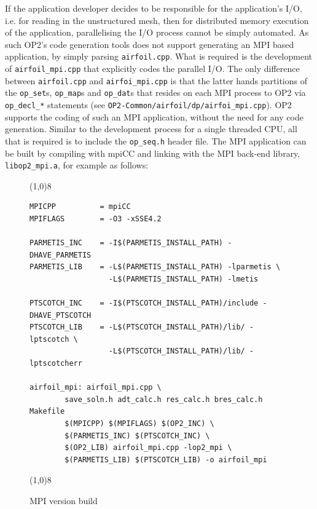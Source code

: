 \documentclass[11pt]{article}
\begin{document}
If the application developer decides to be responsible for the application's I/O, i.e. for reading in the unstructured
mesh, then for distributed memory execution of the application, parallelising the I/O process cannot be simply
automated. As such OP2's code generation tools does not support generating an MPI based application, by simply parsing
\texttt{airfoil.cpp}. What is required is the development of \texttt{airfoil\_mpi.cpp} that explicitly codes the
parallel I/O. The only difference between \texttt{airfoil.cpp} and \texttt{airfoi\_mpi.cpp} is that the latter hands
partitions of the \texttt{op\_set}s, \texttt{op\_map}s and \texttt{op\_dat}s that resides on each MPI process to OP2 via
\texttt{op\_decl\_*} statements (see \texttt{OP2-Common/airfoil/dp/airfoi\_mpi.cpp}). OP2 supports the coding of such an
MPI application, without the need for any code generation. Similar to the development process for a single threaded CPU,
all that is required is to include the \texttt{op\_seq.h} header file. The MPI application can be built by compiling
with mpiCC and linking with the MPI back-end library, \texttt{libop2\_mpi.a}, for example as follows:

\begin{figure}[!h]\small
\vspace{-0pt}\noindent\line(1,0){8}\vspace{-10pt}
\begin{lstlisting}
MPICPP          = mpiCC
MPIFLAGS        = -O3 -xSSE4.2 

PARMETIS_INC    = -I$(PARMETIS_INSTALL_PATH) -DHAVE_PARMETIS
PARMETIS_LIB    = -L$(PARMETIS_INSTALL_PATH) -lparmetis \
                  -L$(PARMETIS_INSTALL_PATH) -lmetis

PTSCOTCH_INC    = -I$(PTSCOTCH_INSTALL_PATH)/include -DHAVE_PTSCOTCH
PTSCOTCH_LIB    = -L$(PTSCOTCH_INSTALL_PATH)/lib/ -lptscotch \
                  -L$(PTSCOTCH_INSTALL_PATH)/lib/ -lptscotcherr

airfoil_mpi: airfoil_mpi.cpp \
        save_soln.h adt_calc.h res_calc.h bres_calc.h Makefile
        $(MPICPP) $(MPIFLAGS) $(OP2_INC) \
        $(PARMETIS_INC) $(PTSCOTCH_INC) \
        $(OP2_LIB) airfoil_mpi.cpp -lop2_mpi \
        $(PARMETIS_LIB) $(PTSCOTCH_LIB) -o airfoil_mpi
\end{lstlisting}\vspace{-10pt}
\vspace{-0pt}\noindent\line(1,0){8}\vspace{-10pt}
\caption{\small MPI version build }
\normalsize\vspace{-10pt}\label{fig:mpibuild}
\end{figure}
\end{document}
